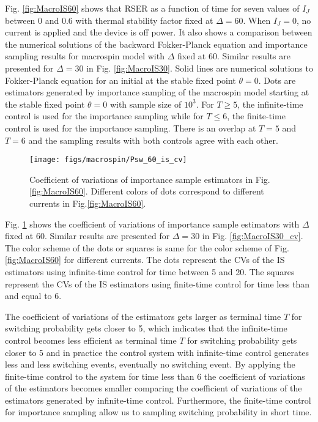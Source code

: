 \documentclass[journal,transmag]{IEEEtran}
\begin{document}
Fig. \ref{fig:MacroIS60} shows that RSER as a function of time for seven values of $I_J$ between $0$ and $ 0.6$ with thermal stability factor fixed at $\Delta = 60$. When $I_J = 0$, no current is applied and the device is off power. It also shows a comparison between the numerical solutions of the backward Fokker-Planck equation and importance sampling results for macrospin model with $\Delta$ fixed at $60$. Similar results are presented for $\Delta = 30$ in Fig. \ref{fig:MacroIS30}.  Solid lines are numerical solutions to Fokker-Planck equation for an initial at the stable fixed point $\theta = 0$. Dots are estimators generated by importance sampling of the macrospin model starting at the stable fixed point $\theta = 0$ with sample size of $10^3$. For $T \ge 5$, the infinite-time control is used for the importance sampling while for $T \le 6$, the finite-time control is used for the importance sampling. There is an overlap at $T = 5$ and $T = 6$ and the sampling results with both controls agree with each other. 
\begin{figure}[h]
   \centering
         \texttt{[image: figs/macrospin/Psw\_60\_is\_cv]} 
            \caption{Coefficient of variations of importance sample estimators in Fig.\ref{fig:MacroIS60}. Different colors of dots correspond to different currents in Fig.\ref{fig:MacroIS60}.}
   \label{fig:MacroIS60_cv}
\end{figure}

Fig. \ref{fig:MacroIS60_cv} shows the coefficient of variations of importance sample estimators with $\Delta$ fixed at 60.  Similar results are presented for $\Delta = 30$ in Fig. \ref{fig:MacroIS30_cv}. The color scheme of the dots or squares is same for the color scheme of  Fig. \ref{fig:MacroIS60} for different currents.  The dots represent  the CVs of the IS estimators using infinite-time control for time between 5 and 20.  The squares represent the CVs of the IS estimators using finite-time control for time less than and equal to 6. 

The coefficient of variations of the estimators gets larger as terminal time $T$ for switching probability gets closer to 5, which indicates that the infinite-time control becomes less efficient as terminal time $T$ for switching probability gets closer to 5 and in practice the control system with infinite-time control generates less and less switching events, eventually no switching event. By applying the finite-time control to the system for time less than 6 the coefficient of variations of the estimators becomes smaller comparing the coefficient of variations of the estimators generated by infinite-time control. Furthermore, the finite-time control for importance sampling allow us to sampling switching probability in short time. 
\end{document}
